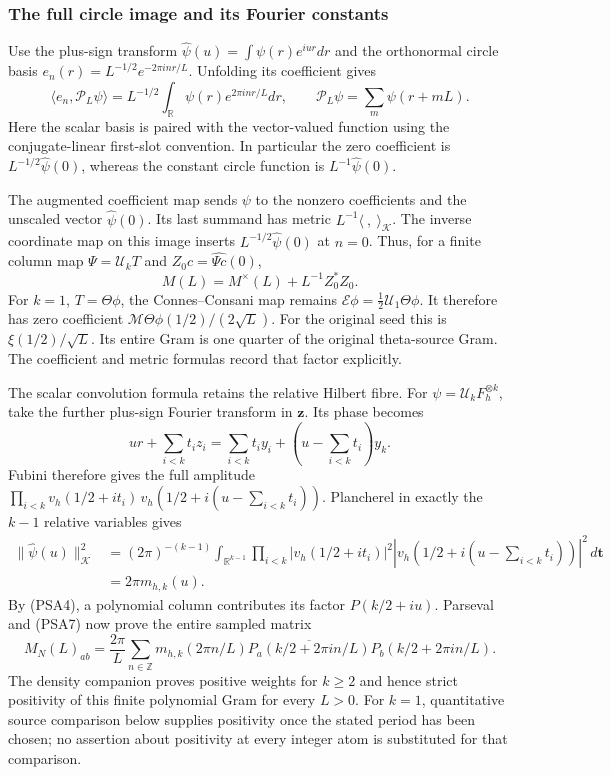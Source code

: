 \subsubsection{The full circle image and its Fourier constants}

Use the plus-sign transform
$\widehat\psi(u)=\int\psi(r)e^{iur}dr$ and the orthonormal circle
basis $e_n(r)=L^{-1/2}e^{-2\pi inr/L}$. Unfolding its coefficient gives
\[
 \langle e_n,\mathcal P_L\psi\rangle
 =L^{-1/2}\int_{\mathbb R}\psi(r)e^{2\pi inr/L}dr,
 \qquad \mathcal P_L\psi=\sum_m\psi(r+mL).
 \tag{PSA7}
\]
Here the scalar basis is paired with the vector-valued function using
the conjugate-linear first-slot convention. In particular the zero
coefficient is $L^{-1/2}\widehat\psi(0)$, whereas the constant circle
function is $L^{-1}\widehat\psi(0)$.

The augmented coefficient map sends $\psi$ to the nonzero coefficients
and the unscaled vector $\widehat\psi(0)$. Its last summand has metric
$L^{-1}\langle\ ,\ \rangle_{\mathcal K}$. The inverse coordinate map
on this image inserts $L^{-1/2}\widehat\psi(0)$ at $n=0$. Thus, for a
finite column map $\Psi=\mathcal U_kT$ and $Z_0c=\widehat{\Psi c}(0)$,
\[
 M(L)=M^\times(L)+L^{-1}Z_0^*Z_0.
 \tag{PSA8}
\]
For $k=1$, $T=\Theta\phi$, the Connes--Consani map remains
$\mathcal E\phi=\tfrac12\mathcal U_1\Theta\phi$. It therefore has
zero coefficient $\mathcal M\Theta\phi(1/2)/(2\sqrt L)$. For the
original seed this is $\xi(1/2)/\sqrt L$. Its entire Gram is one quarter
of the original theta-source Gram. The coefficient and metric formulas
record that factor explicitly.

The scalar convolution formula retains the relative Hilbert fibre.
For $\psi=\mathcal U_kF_h^{\otimes k}$, take the further plus-sign
Fourier transform in $\mathbf z$. Its phase becomes
\[
 ur+\sum_{i<k}t_i z_i
 =\sum_{i<k}t_i y_i+
       \left(u-\sum_{i<k}t_i\right)y_k.
 \tag{PSA9}
\]
Fubini therefore gives the full amplitude
$\prod_{i<k}v_h(1/2+it_i)\,
 v_h(1/2+i(u-\sum_{i<k}t_i))$.
Plancherel in exactly the $k-1$ relative variables gives
\[
 \begin{split}
 \|\widehat\psi(u)\|_{\mathcal K}^2
 &=(2\pi)^{-(k-1)}\int_{\mathbb R^{k-1}}
   \prod_{i<k}|v_h(1/2+it_i)|^2
   |v_h(1/2+i(u-\sum_{i<k}t_i))|^2\,d\mathbf t\\
 &=2\pi m_{h,k}(u).
 \end{split}
 \tag{PSA10}
\]
By (PSA4), a polynomial column contributes its factor
$P(k/2+iu)$. Parseval and (PSA7) now prove the entire sampled matrix
\[
 M_N(L)_{ab}=\frac{2\pi}{L}\sum_{n\in\mathbb Z}
 m_{h,k}(2\pi n/L)
 \overline{P_a(k/2+2\pi in/L)}P_b(k/2+2\pi in/L).
 \tag{PSA11}
\]
The density companion proves positive weights for $k\ge2$ and hence
strict positivity of this finite polynomial Gram for every $L>0$.
For $k=1$, quantitative source comparison below supplies positivity
once the stated period has been chosen; no assertion about positivity
at every integer atom is substituted for that comparison.

